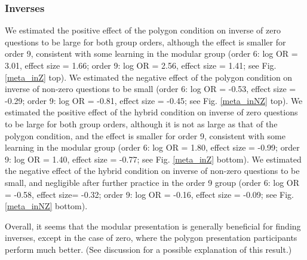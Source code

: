 \documentclass[man,10pt]{apa6}
\begin{document}
\subsubsection{Inverses} We estimated the positive effect of the polygon condition on inverse of zero questions to be large for both group orders, although the effect is smaller for order 9, consistent with some learning in the modular group (order 6: log OR = 3.01, effect size = 1.66; order 9: log OR = 2.56, effect size = 1.41; see Fig. \ref{meta_inZ} top). We estimated the negative effect of the polygon condition on inverse of non-zero questions to be small (order 6: log OR = -0.53, effect size = -0.29; order 9: log OR = -0.81, effect size = -0.45; see Fig. \ref{meta_inNZ} top). We estimated the positive effect of the hybrid condition on inverse of zero questions to be large for both group orders, although it is not as large as that of the polygon condition, and the effect is smaller for order 9, consistent with some learning in the modular group (order 6: log OR = 1.80, effect size = -0.99; order 9: log OR = 1.40, effect size = -0.77; see Fig. \ref{meta_inZ} bottom). We estimated the negative effect of the hybrid condition on inverse of non-zero questions to be small, and negligible after further practice in the order 9 group (order 6: log OR = -0.58, effect size= -0.32; order 9: log OR = -0.16, effect size = -0.09; see Fig. \ref{meta_inNZ} bottom).\par
Overall, it seems that the modular presentation is generally beneficial for finding inverses, except in the case of zero, where the polygon presentation participants perform much better. (See discussion for a possible explanation of this result.) 
\end{document}

